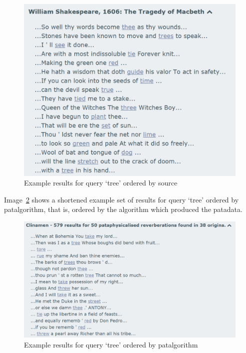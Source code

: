 \begin{figure}[!htbp] %
  \centering
  \includegraphics[width=\linewidth]{images/listsourcetree}
\caption[Source result list for query `tree']{Example results for query `tree' ordered by source}
\label{img:listsourcetree}
\end{figure}

Image~\ref{img:listalgotree} shows a shortened example set of results for query `tree' ordered by patalgorithm, that is, ordered by the algorithm which produced the patadata.

\begin{figure}[!htbp] %
  \centering
  \includegraphics[width=\linewidth]{images/listalgotree}
\caption[Source result list for query `tree']{Example results for query `tree' ordered by patalgorithm}
\label{img:listalgotree}
\end{figure}


